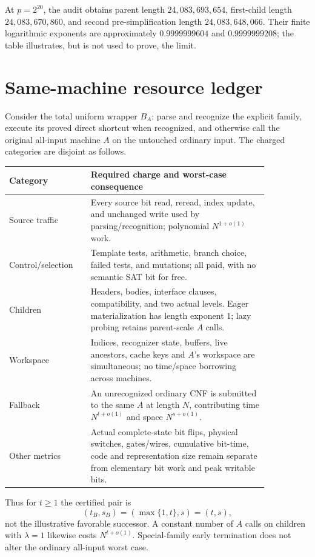 \documentclass[11pt]{article}
\begin{document}
At $p=2^{20}$, the audit obtains parent length $24{,}083{,}693{,}654$,
first-child length $24{,}083{,}670{,}860$, and second pre-simplification length
$24{,}083{,}648{,}066$.  Their finite logarithmic exponents are approximately
$0.9999999604$ and $0.9999999208$; the table illustrates, but is not used to
prove, the limit.

\section*{Same-machine resource ledger}
Consider the total uniform wrapper $B_A$: parse and recognize the explicit
family, execute its proved direct shortcut when recognized, and otherwise call
the original all-input machine $A$ on the untouched ordinary input.
The charged categories are disjoint as follows.
\begin{center}
\begin{tabular}{p{0.25\linewidth}p{0.60\linewidth}}
\toprule
Category & Required charge and worst-case consequence\\
\midrule
Source traffic & Every source bit read, reread, index update, and unchanged
write used by parsing/recognition; polynomial $N^{1+o(1)}$ work.\\
Control/selection & Template tests, arithmetic, branch choice, failed tests,
and mutations; all paid, with no semantic SAT bit for free.\\
Children & Headers, bodies, interface clauses, compatibility, and two actual
levels.  Eager materialization has length exponent $1$; lazy probing retains
parent-scale $A$ calls.\\
Workspace & Indices, recognizer state, buffers, live ancestors, cache keys and
$A$'s workspace are simultaneous; no time/space borrowing across machines.\\
Fallback & An unrecognized ordinary CNF is submitted to the same $A$ at length
$N$, contributing time $N^{t+o(1)}$ and space $N^{s+o(1)}$.\\
Other metrics & Actual complete-state bit flips, physical switches,
gates/wires, cumulative bit-time, code and representation size remain separate
from elementary bit work and peak writable bits.\\
\bottomrule
\end{tabular}
\end{center}
Thus for $t\ge 1$ the certified pair is
\[
 (t_B,s_B)=(\max\{1,t\},s)=(t,s),
\]
not the illustrative favorable successor.  A constant number of $A$ calls on
children with $\lambda=1$ likewise costs $N^{t+o(1)}$.  Special-family early
termination does not alter the ordinary all-input worst case.
\end{document}
